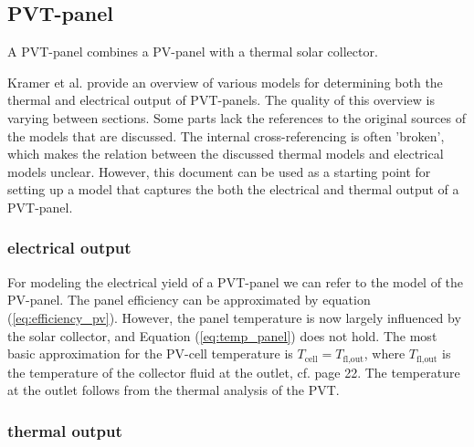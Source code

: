 \subsection{PVT-panel}

A PVT-panel combines a PV-panel with a thermal solar collector. 

Kramer et al. \cite{SHC2020PVT} provide an overview of various models for determining both the thermal and electrical output of PVT-panels. The quality of this overview is varying between sections. Some parts lack the references to the original sources of the models that are discussed. The internal cross-referencing is often 'broken', which makes the relation between the discussed thermal models and electrical models unclear. However, this document can be used as a starting point for setting up a model that captures the both the electrical and thermal output of a PVT-panel.

\subsubsection{electrical output}
For modeling the electrical yield of a PVT-panel we can refer to the model of the PV-panel. The panel efficiency can be approximated by equation (\ref{eq:efficiency_pv}). However, the panel temperature is now largely influenced by the solar collector, and Equation (\ref{eq:temp_panel}) does not hold. The most basic approximation for the PV-cell temperature is $T_{\text{cell}} = T_{\text{fl,out}}$, where $T_{\text{fl,out}} $ is the temperature of the collector fluid at the outlet, cf. \cite{SHC2020PVT} page 22. The temperature at the outlet follows from the thermal analysis of the PVT.

\subsubsection{thermal output}




